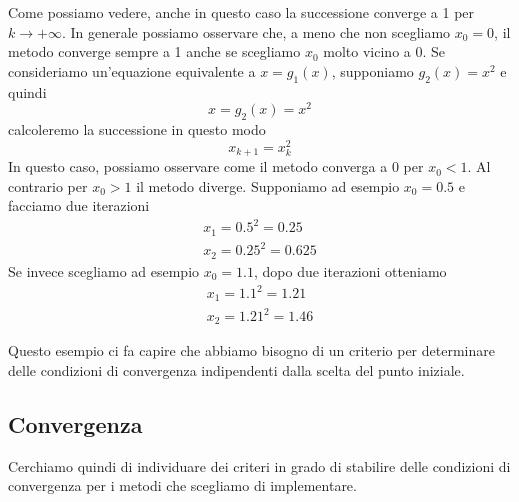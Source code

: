 \begin{example}
\begin{center}
	\end{center}
	Come possiamo vedere, anche in questo caso la successione converge a 1 per
	$k \to +\infty$. In generale possiamo osservare che, a meno che non
	scegliamo $x_0 = 0$, il metodo converge sempre a 1 anche se scegliamo $x_0$
	molto vicino a 0. Se consideriamo un'equazione equivalente a $x = g_1(x)$,
	supponiamo $g_2(x) = x^2$ e quindi
	\[ x = g_2(x) = x^2 \]
	calcoleremo la successione in questo modo
	\[ x_{k+1} = x_k^2 \]
	In questo caso, possiamo osservare come il metodo converga a 0 per $x_0 <
	1$. Al contrario per $x_0 > 1$ il metodo diverge. Supponiamo ad esempio $x_0
	= 0.5$ e facciamo due iterazioni
	\begin{gather*}
		x_1 = 0.5^2 = 0.25 \\
		x_2 = 0.25^2 = 0.625
	\end{gather*}
	Se invece scegliamo ad esempio $x_0 = 1.1$, dopo due iterazioni otteniamo
	\begin{gather*}
		x_1 = 1.1^2 = 1.21 \\
		x_2 = 1.21^2 = 1.46
	\end{gather*}
\end{example}

Questo esempio ci fa capire che abbiamo bisogno di un criterio per determinare delle condizioni di convergenza
indipendenti dalla scelta del punto iniziale.

\subsection{Convergenza}
Cerchiamo quindi di individuare dei criteri in grado di stabilire delle condizioni di convergenza per i metodi
che scegliamo di implementare.

